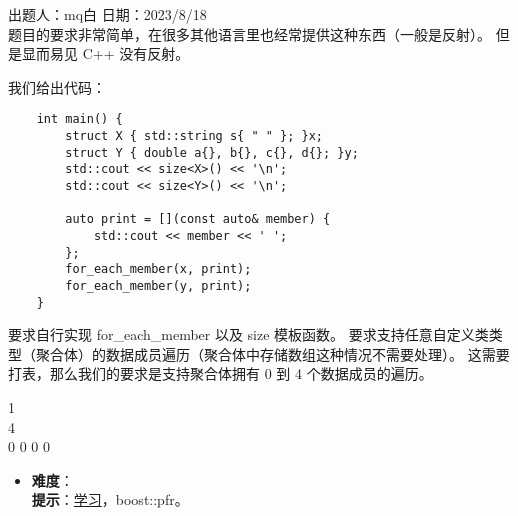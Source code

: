 出题人：mq白 日期：2023/8/18\\

题目的要求非常简单，在很多其他语言里也经常提供这种东西（一般是反射）。 但是显而易见 C++ 没有反射。

我们给出代码：

\begin{verbatim}
    int main() {
        struct X { std::string s{ " " }; }x;
        struct Y { double a{}, b{}, c{}, d{}; }y;
        std::cout << size<X>() << '\n';
        std::cout << size<Y>() << '\n';
    
        auto print = [](const auto& member) {
            std::cout << member << ' ';
        };
        for_each_member(x, print);
        for_each_member(y, print);
    }
\end{verbatim}

要求自行实现 for\_each\_member 以及 size 模板函数。 要求支持任意自定义类类型（聚合体）的数据成员遍历（聚合体中存储数组这种情况不需要处理）。 这需要打表，那么我们的要求是支持聚合体拥有 0 到 4 个数据成员的遍历。

\begin{tcolorbox}[title = {要求运行结果},
    fonttitle = \bfseries, fontupper = \sffamily, fontlower = \itshape]
    1           \\
    4           \\
      0 0 0 0           %
\end{tcolorbox}

\begin{itemize}
\item \textbf{难度}：  \\
      \textbf{提示}：\href{https://akrzemi1.wordpress.com/2020/10/01/reflection-for-aggregates/}{学习}，boost::pfr。
\end{itemize}